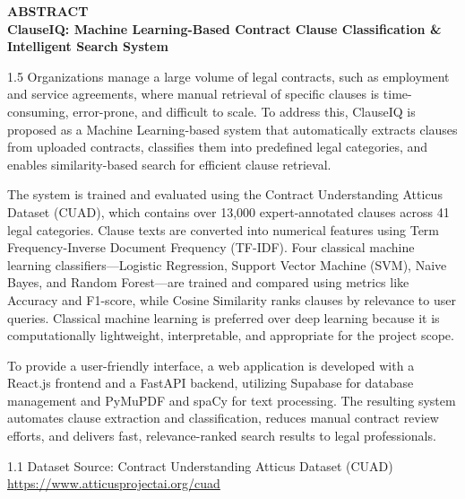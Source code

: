 \documentclass[12pt, a4paper]{article}
\begin{document}
\thispagestyle{empty} %

\begin{center}
    \textbf{\fontsize{16pt}{19.2pt}\selectfont ABSTRACT} \\[4pt]
    \textbf{\fontsize{14pt}{16.8pt}\selectfont ClauseIQ: Machine Learning-Based Contract Clause Classification \& Intelligent Search System}
\end{center}

\begin{spacing}{1.5}
Organizations manage a large volume of legal contracts, such as employment and service agreements, where manual retrieval of specific clauses is time-consuming, error-prone, and difficult to scale. To address this, ClauseIQ is proposed as a Machine Learning-based system that automatically extracts clauses from uploaded contracts, classifies them into predefined legal categories, and enables similarity-based search for efficient clause retrieval.

The system is trained and evaluated using the Contract Understanding Atticus Dataset (CUAD), which contains over 13,000 expert-annotated clauses across 41 legal categories. Clause texts are converted into numerical features using Term Frequency-Inverse Document Frequency (TF-IDF). Four classical machine learning classifiers---Logistic Regression, Support Vector Machine (SVM), Naive Bayes, and Random Forest---are trained and compared using metrics like Accuracy and F1-score, while Cosine Similarity ranks clauses by relevance to user queries. Classical machine learning is preferred over deep learning because it is computationally lightweight, interpretable, and appropriate for the project scope.

To provide a user-friendly interface, a web application is developed with a React.js frontend and a FastAPI backend, utilizing Supabase for database management and PyMuPDF and spaCy for text processing. The resulting system automates clause extraction and classification, reduces manual contract review efforts, and delivers fast, relevance-ranked search results to legal professionals.
\end{spacing}

\vspace{6pt}
\begin{spacing}{1.1}
\noindent Dataset Source: Contract Understanding Atticus Dataset (CUAD) \\
\url{https://www.atticusprojectai.org/cuad}
\end{spacing}
\end{document}
